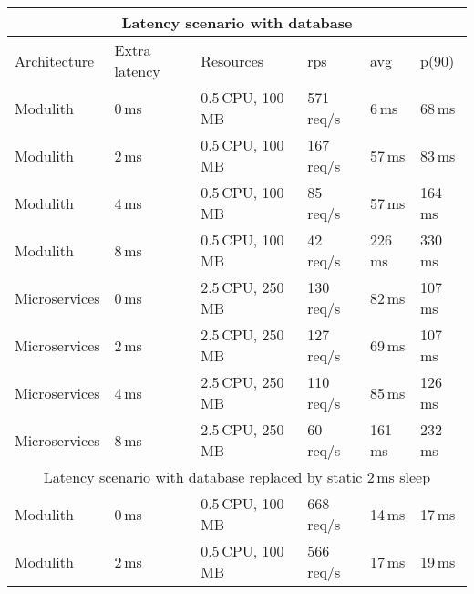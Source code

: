 \begin{table}
    \begin{tabular}{ |p{3cm}||p{1.2cm}|p{3cm}|p{1.5cm}|p{1.5cm}|p{1.5cm}| }
        \hline
        \multicolumn{6}{|c|}{Latency scenario with database}                                 \\
        \hline
        Architecture  & Extra latency & Resources         & rps        & avg     & p(90)     \\%
        \hline
        \rowcolor{Gray}
        Modulith      & 0\,ms         & 0.5\,CPU, 100\,MB & 571\,req/s & 6\,ms   & 68\,ms    \\ %
        Modulith      & 2\,ms         & 0.5\,CPU, 100\,MB & 167\,req/s & 57\,ms  & 83\,ms    \\ %
        Modulith      & 4\,ms         & 0.5\,CPU, 100\,MB & 85\,req/s  & 57\,ms  & 164\,ms   \\ %
        Modulith      & 8\,ms         & 0.5\,CPU, 100\,MB & 42\,req/s  & 226\,ms & 330\,ms   \\ %
        \rowcolor{Gray}
        Microservices & 0\,ms         & 2.5\,CPU, 250\,MB & 130\,req/s & 82\,ms  & 107\,ms   \\ %
        Microservices & 2\,ms         & 2.5\,CPU, 250\,MB & 127\,req/s & 69\,ms  & 107\,ms   \\ %
        Microservices & 4\,ms         & 2.5\,CPU, 250\,MB & 110\,req/s & 85\,ms  & 126\,ms   \\ %
        Microservices & 8\,ms         & 2.5\,CPU, 250\,MB & 60\,req/s  & 161\,ms & 232\,ms   \\ %
        \hline
        \multicolumn{6}{|c|}{Latency scenario with database replaced by static 2\,ms sleep } \\
        \hline
        \rowcolor{Gray}
        Modulith      & 0\,ms         & 0.5\,CPU, 100\,MB & 668\,req/s & 14\,ms  & 17\,ms    \\ %
        Modulith      & 2\,ms         & 0.5\,CPU, 100\,MB & 566\,req/s & 17\,ms  & 19\,ms    \\ %

\end{tabular}
\end{table}
